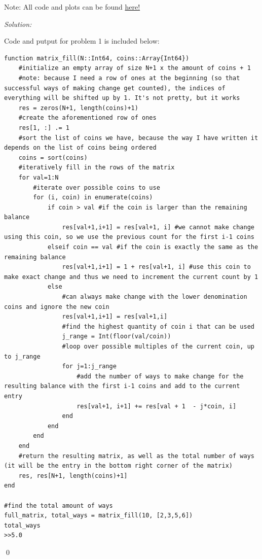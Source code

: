 \documentclass[12pt]{article}
\newenvironment{problem}[2][Problem]{\begin{trivlist}
       \item[\hskip \labelsep {\bfseries #1}\hskip \labelsep {\bfseries #2.}]}{\end{trivlist}}
\newenvironment{sol}
           {\emph{Solution:}
           }
           {
           \qed
           }
\begin{document}
       \lstset{language=Julia}
       Note: All code and plots can be found \href{https://github.com/johnfhiggins/Coding-Bootcamp/tree/main/PS4}{here!}
       \begin{problem}{1}
       
       \end{problem}
       \begin{sol}
        Code and putput for problem 1 is included below:
        \begin{lstlisting}
function matrix_fill(N::Int64, coins::Array{Int64})
    #initialize an empty array of size N+1 x the amount of coins + 1
    #note: because I need a row of ones at the beginning (so that successful ways of making change get counted), the indices of everything will be shifted up by 1. It's not pretty, but it works
    res = zeros(N+1, length(coins)+1)
    #create the aforementioned row of ones
    res[1, :] .= 1
    #sort the list of coins we have, because the way I have written it depends on the list of coins being ordered
    coins = sort(coins)
    #iteratively fill in the rows of the matrix 
    for val=1:N
        #iterate over possible coins to use
        for (i, coin) in enumerate(coins)
            if coin > val #if the coin is larger than the remaining balance
                res[val+1,i+1] = res[val+1, i] #we cannot make change using this coin, so we use the previous count for the first i-1 coins
            elseif coin == val #if the coin is exactly the same as the remaining balance
                res[val+1,i+1] = 1 + res[val+1, i] #use this coin to make exact change and thus we need to increment the current count by 1 
            else
                #can always make change with the lower denomination coins and ignore the new coin
                res[val+1,i+1] = res[val+1,i]
                #find the highest quantity of coin i that can be used 
                j_range = Int(floor(val/coin))
                #loop over possible multiples of the current coin, up to j_range
                for j=1:j_range
                    #add the number of ways to make change for the resulting balance with the first i-1 coins and add to the current entry 
                    res[val+1, i+1] += res[val + 1  - j*coin, i]
                end
            end
        end
    end
    #return the resulting matrix, as well as the total number of ways (it will be the entry in the bottom right corner of the matrix)
    res, res[N+1, length(coins)+1]
end 

#find the total amount of ways 
full_matrix, total_ways = matrix_fill(10, [2,3,5,6])
total_ways
>>5.0
        \end{lstlisting}
       \end{sol}
\end{document}
